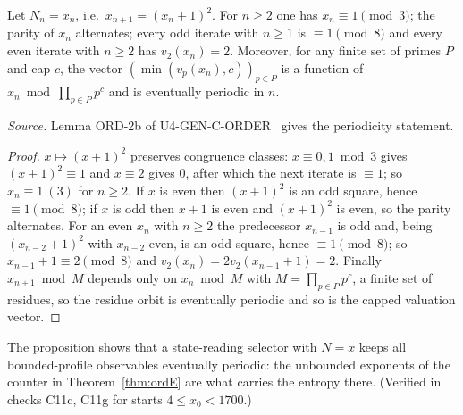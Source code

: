 \begin{proposition}\label{prop:ord2}
Let $N_n=x_n$, i.e.\ $x_{n+1}=(x_n+1)^2$. For $n\ge2$ one has $x_n\equiv1\pmod3$; the parity of $x_n$ alternates; every odd iterate with $n\ge1$ is $\equiv1\pmod8$ and every even iterate with $n\ge2$ has $v_2(x_n)=2$. Moreover, for any finite set of primes $P$ and cap $c$, the vector $(\min(v_p(x_n),c))_{p\in P}$ is a function of $x_n\bmod\prod_{p\in P}p^c$ and is eventually periodic in $n$.
\end{proposition}
\noindent\emph{Source.} Lemma ORD-2b of U4-GEN-C-ORDER~\cite{u4order} gives the periodicity statement.
\begin{proof}
$x\mapsto(x+1)^2$ preserves congruence classes: $x\equiv0,1\bmod3$ gives $(x+1)^2\equiv1$ and $x\equiv2$ gives $0$, after which the next iterate is $\equiv1$; so $x_n\equiv1\ (3)$ for $n\ge2$. If $x$ is even then $(x+1)^2$ is an odd square, hence $\equiv1\pmod8$; if $x$ is odd then $x+1$ is even and $(x+1)^2$ is even, so the parity alternates. For an even $x_n$ with $n\ge2$ the predecessor $x_{n-1}$ is odd and, being $(x_{n-2}+1)^2$ with $x_{n-2}$ even, is an odd square, hence $\equiv1\pmod8$; so $x_{n-1}+1\equiv2\pmod8$ and $v_2(x_n)=2v_2(x_{n-1}+1)=2$. Finally $x_{n+1}\bmod M$ depends only on $x_n\bmod M$ with $M=\prod_{p\in P}p^c$, a finite set of residues, so the residue orbit is eventually periodic and so is the capped valuation vector. \end{proof}
\begin{remark}
The proposition shows that a state-reading selector with $N=x$ keeps all bounded-profile observables eventually periodic: the unbounded exponents of the counter in Theorem~\ref{thm:ordE} are what carries the entropy there. (Verified in checks C11c, C11g for starts $4\le x_0<1700$.)
\end{remark}
